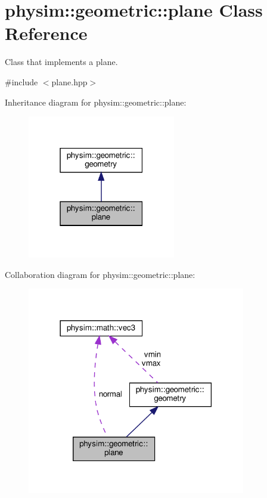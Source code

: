 \hypertarget{classphysim_1_1geometric_1_1plane}{}\section{physim\+:\+:geometric\+:\+:plane Class Reference}
\label{classphysim_1_1geometric_1_1plane}


Class that implements a plane.  




{\ttfamily \#include $<$plane.\+hpp$>$}



Inheritance diagram for physim\+:\+:geometric\+:\+:plane\+:\nopagebreak
\begin{figure}[H]
\begin{center}
\leavevmode
\includegraphics[width=183pt]{classphysim_1_1geometric_1_1plane__inherit__graph}
\end{center}
\end{figure}


Collaboration diagram for physim\+:\+:geometric\+:\+:plane\+:\nopagebreak
\begin{figure}[H]
\begin{center}
\leavevmode
\includegraphics[width=270pt]{classphysim_1_1geometric_1_1plane__coll__graph}
\end{center}
\end{figure}
